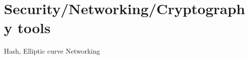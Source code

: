 \chapter{Security/Networking/Cryptography tools} %
\label{cha:Security/Networking/Cryptography tools}


Hash,
Elliptic curve
Networking